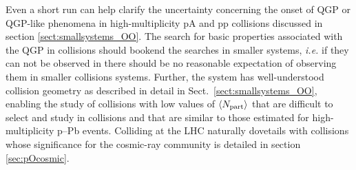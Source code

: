 Even a short \OO run can help clarify the uncertainty concerning the onset of QGP or QGP-like phenomena in high-multiplicity pA and pp collisions discussed in section \ref{sect:smallsystems_OO}.  The search for basic properties associated with the QGP in \OO collisions should bookend the searches in smaller systems, \textit{i.e.} if they can not be observed in \OO there should be no reasonable expectation of observing them in smaller collisions systems.  Further, the \OO system has well-understood collision geometry as described in detail in Sect.~\ref{sect:smallsystems_OO}, enabling the study of collisions with low values of $\langle N_{\rm part}\rangle$ that are difficult to select and study in \PbPb collisions and that are similar to those estimated for high-multiplicity p--Pb events. Colliding \OO at the LHC naturally dovetails with \pO collisions whose significance for the cosmic-ray community is detailed in section \ref{sec:pOcosmic}.

